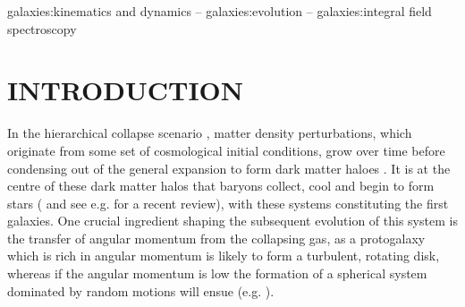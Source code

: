 \documentclass[a4paper,fleqn,usenatbib]{mn2e}
\begin{document}
\begin{keywords}
galaxies:kinematics and dynamics -- galaxies:evolution -- galaxies:integral field spectroscopy
\end{keywords}



\section{INTRODUCTION}

In the hierarchical collapse scenario \citep{Rees1977,Fall1980}, matter density perturbations, which originate from some set of cosmological initial conditions, grow over time before condensing out of the general expansion to form dark matter haloes \cite{Silk1968,Peebles1970}.
It is at the centre of these dark matter halos that baryons collect, cool and begin to form stars (\cite{Birnboim2003,Keres2005,Dekel2006} and see e.g. \cite{Mo2010} for a recent review), with these systems constituting the first galaxies.
One crucial ingredient shaping the subsequent evolution of this system is the transfer of angular momentum from the collapsing gas, as a protogalaxy which is rich in angular momentum is likely to form a turbulent, rotating disk, whereas if the angular momentum is low the formation of a spherical system dominated by random motions will ensue (e.g. \cite{Fall1983}). 
\end{document}
